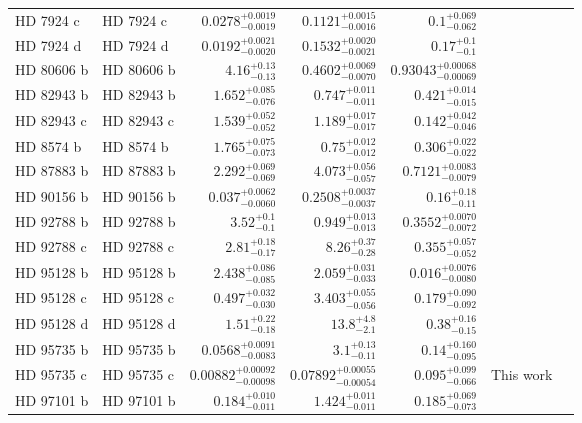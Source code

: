\begin{longtable*}{llrrrrr}
HD 7924 c & HD 7924 c & $0.0278^{+0.0019}_{-0.0019}$ & $0.1121^{+0.0015}_{-0.0016}$ & $0.1^{+0.069}_{-0.062}$ & \cite{Fulton15} & \\ 
HD 7924 d & HD 7924 d & $0.0192^{+0.0021}_{-0.0020}$ & $0.1532^{+0.0020}_{-0.0021}$ & $0.17^{+0.1}_{-0.1}$ & \cite{Fulton15} & \\ 
HD 80606 b & HD 80606 b & $4.16^{+0.13}_{-0.13}$ & $0.4602^{+0.0069}_{-0.0070}$ & $0.93043^{+0.00068}_{-0.00069}$ & \cite{Wittenmyer07} & \\ 
HD 82943 b & HD 82943 b & $1.652^{+0.085}_{-0.076}$ & $0.747^{+0.011}_{-0.011}$ & $0.421^{+0.014}_{-0.015}$ & \cite{Mayor04} & \\ 
HD 82943 c & HD 82943 c & $1.539^{+0.052}_{-0.052}$ & $1.189^{+0.017}_{-0.017}$ & $0.142^{+0.042}_{-0.046}$ & \cite{Mayor04} & \\ 
HD 8574 b & HD 8574 b & $1.765^{+0.075}_{-0.073}$ & $0.75^{+0.012}_{-0.012}$ & $0.306^{+0.022}_{-0.022}$ & \cite{Perrier03} & \\ 
HD 87883 b & HD 87883 b & $2.292^{+0.069}_{-0.069}$ & $4.073^{+0.056}_{-0.057}$ & $0.7121^{+0.0083}_{-0.0079}$ & \cite{Fischer09} & \\ 
HD 90156 b & HD 90156 b & $0.037^{+0.0062}_{-0.0060}$ & $0.2508^{+0.0037}_{-0.0037}$ & $0.16^{+0.18}_{-0.11}$ & \cite{Mordasini11} & \\ 
HD 92788 b & HD 92788 b & $3.52^{+0.1}_{-0.1}$ & $0.949^{+0.013}_{-0.013}$ & $0.3552^{+0.0070}_{-0.0072}$ & \cite{Fischer01} & \\ 
HD 92788 c & HD 92788 c & $2.81^{+0.18}_{-0.17}$ & $8.26^{+0.37}_{-0.28}$ & $0.355^{+0.057}_{-0.052}$ & \cite{Rickman19} & \\ 
HD 95128 b & HD 95128 b & $2.438^{+0.086}_{-0.085}$ & $2.059^{+0.031}_{-0.033}$ & $0.016^{+0.0076}_{-0.0080}$ & \cite{Naef04} & \\ 
HD 95128 c & HD 95128 c & $0.497^{+0.032}_{-0.030}$ & $3.403^{+0.055}_{-0.056}$ & $0.179^{+0.090}_{-0.092}$ & \cite{Wittenmyer07} & \\ 
HD 95128 d & HD 95128 d & $1.51^{+0.22}_{-0.18}$ & $13.8^{+4.8}_{-2.1}$ & $0.38^{+0.16}_{-0.15}$ & \cite{Gregory10} & \\ 
HD 95735 b & HD 95735 b & $0.0568^{+0.0091}_{-0.0083}$ & $3.1^{+0.13}_{-0.11}$ & $0.14^{+0.160}_{-0.095}$ & \cite{Diaz19} & \\ 
HD 95735 c & HD 95735 c & $0.00882^{+0.00092}_{-0.00098}$ & $0.07892^{+0.00055}_{-0.00054}$ & $0.095^{+0.099}_{-0.066}$ & This work & \\ 
HD 97101 b & HD 97101 b & $0.184^{+0.010}_{-0.011}$ & $1.424^{+0.011}_{-0.011}$ & $0.185^{+0.069}_{-0.073}$ & \cite{Dedrick et al. in prep} & \\ 

\end{longtable*}

